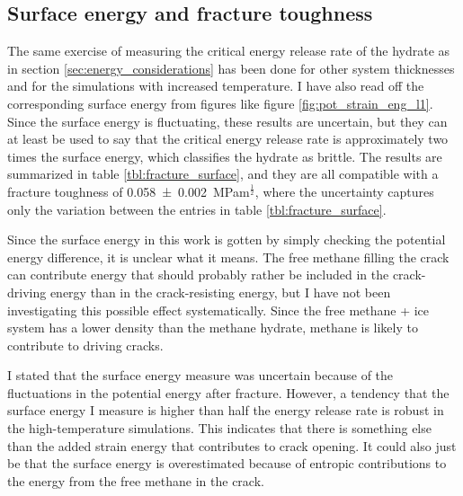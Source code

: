 \subsection{Surface energy and fracture toughness}
The same exercise of measuring the critical energy release rate of the hydrate as in section \ref{sec:energy_considerations} has been done for other system thicknesses and for the simulations with increased temperature. I have also read off the corresponding surface energy from figures like figure \ref{fig:pot_strain_eng_l1}. Since the surface energy is fluctuating, these results are uncertain, but they can at least be used to say that the critical energy release rate is approximately two times the surface energy, which classifies the hydrate as brittle. The results are summarized in table \ref{tbl:fracture_surface}, and they are all compatible with a fracture toughness of \SI{0.058\pm0.002}MPam$^\frac{1}{2}$, where the uncertainty captures only the variation between the entries in table \ref{tbl:fracture_surface}.

Since the surface energy in this work is gotten by simply checking the potential energy difference, it is unclear what it means. The free methane filling the crack can contribute energy that should probably rather be included in the crack-driving energy than in the crack-resisting energy, but I have not been investigating this possible effect systematically. Since the free methane + ice system has a lower density than the methane hydrate, methane is likely to contribute to driving cracks. 

I stated that the surface energy measure was uncertain because of the fluctuations in the potential energy after fracture. However, a tendency that the surface energy I measure is higher than half the energy release rate is robust in the high-temperature simulations. This indicates that there is something else than the added strain energy that contributes to crack opening. It could also just be that the surface energy is overestimated because of entropic contributions to the energy from the free methane in the crack.

